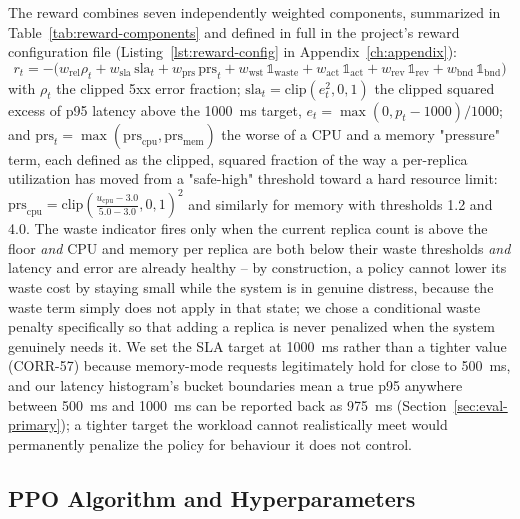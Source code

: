 The reward combines seven independently weighted components, summarized in
Table~\ref{tab:reward-components} and defined in full in the project's
reward configuration file (Listing~\ref{lst:reward-config} in
Appendix~\ref{ch:appendix}):
\begin{equation}
r_t = -\big(w_{\text{rel}}\rho_t + w_{\text{sla}}\,\mathrm{sla}_t + w_{\text{prs}}\,\mathrm{prs}_t + w_{\text{wst}}\,\mathbb{1}_{\text{waste}} + w_{\text{act}}\,\mathbb{1}_{\text{act}} + w_{\text{rev}}\,\mathbb{1}_{\text{rev}} + w_{\text{bnd}}\,\mathbb{1}_{\text{bnd}}\big)
\label{eq:reward}
\end{equation}
with $\rho_t$ the clipped 5xx error fraction; $\mathrm{sla}_t =
\mathrm{clip}(e_t^2, 0, 1)$ the clipped squared excess of p95 latency above
the 1000~ms target, $e_t = \max(0, p_t-1000)/1000$; and
$\mathrm{prs}_t = \max(\mathrm{prs}_{\text{cpu}}, \mathrm{prs}_{\text{mem}})$
the worse of a CPU and a memory "pressure" term, each defined as the
clipped, squared fraction of the way a per-replica utilization has moved
from a "safe-high" threshold toward a hard resource limit:
$\mathrm{prs}_{\text{cpu}} = \mathrm{clip}\!\left(\frac{u_{\text{cpu}} -
3.0}{5.0-3.0}, 0, 1\right)^2$ and similarly for memory with thresholds
1.2 and 4.0. The waste indicator fires only when the current replica count
is above the floor \emph{and} CPU and memory per replica are both below
their waste thresholds \emph{and} latency and error are already healthy --
by construction, a policy cannot lower its waste cost by staying small
while the system is in genuine distress, because the waste term simply does
not apply in that state; we chose a conditional waste penalty specifically
so that adding a replica is never penalized when the system genuinely needs
it. We set the SLA target at 1000~ms rather than a tighter value (CORR-57)
because memory-mode requests legitimately hold for close to 500~ms, and our
latency histogram's bucket boundaries mean a true p95 anywhere between
500~ms and 1000~ms can be reported back as 975~ms (Section~\ref{sec:eval-primary});
a tighter target the workload cannot realistically meet would permanently
penalize the policy for behaviour it does not control.

\begin{table}[H]
\centering
\caption[Reward components]{Reward components, weights, and threshold parameters.}
\label{tab:reward-components}
\small

\end{table}

\subsection{PPO Algorithm and Hyperparameters}

